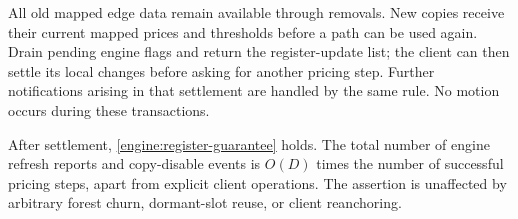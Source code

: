 All old mapped edge data remain available through removals.  New copies
receive their current mapped prices and thresholds before a path can be
used again.  Drain pending engine flags and return the register-update
list; the client can then settle its local changes before asking for
another pricing step.  Further notifications arising in that settlement
are handled by the same rule.  No motion occurs during these
transactions.

\begin{lemma}
\label{engine:refresh-bound}
After settlement, \eqref{engine:register-guarantee} holds.  The total
number of engine refresh reports and copy-disable events is $O(D)$ times
the number of successful pricing steps, apart from explicit client
operations.  The assertion is unaffected by arbitrary forest churn,
dormant-slot reuse, or client reanchoring.
\end{lemma}

